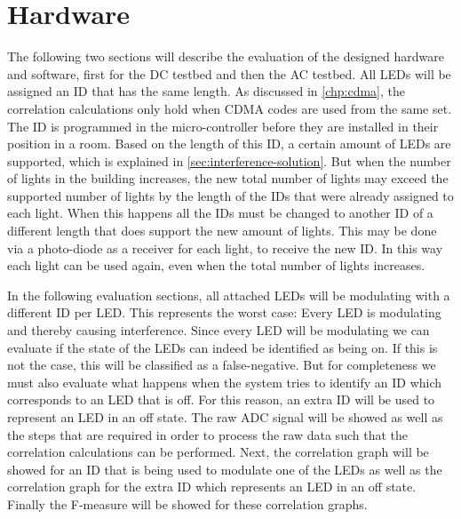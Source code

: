 
\section{Hardware}
\label{sec:hardware-evaluation}

The following two sections will describe the evaluation of the designed hardware and software, first for the DC testbed and then the AC testbed.
All LEDs will be assigned an ID that has the same length.
As discussed in \autoref{chp:cdma}, the correlation calculations only hold when CDMA codes are used from the same set.
The ID is programmed in the micro-controller before they are installed in their position in a room.
Based on the length of this ID, a certain amount of LEDs are supported, which is explained in \autoref{sec:interference-solution}.
But when the number of lights in the building increases, the new total number of lights may exceed the supported number of lights by the length of the IDs that were already assigned to each light.
When this happens all the IDs must be changed to another ID of a different length that does support the new amount of lights.
This may be done via a photo-diode as a receiver for each light, to receive the new ID.
In this way each light can be used again, even when the total number of lights increases.


In the following evaluation sections, all attached LEDs will be modulating with a different ID per LED.
This represents the worst case: Every LED is modulating and thereby causing interference.
Since every LED will be modulating we can evaluate if the state of the LEDs can indeed be identified as being on.
If this is not the case, this will be classified as a false-negative.
But for completeness we must also evaluate what happens when the system tries to identify an ID which corresponds to an LED that is off.
For this reason, an extra ID will be used to represent an LED in an off state.
The raw ADC signal will be showed as well as the steps that are required in order to process the raw data such that the correlation calculations can be performed.
Next, the correlation graph will be showed for an ID that is being used to modulate one of the LEDs as well as the correlation graph for the extra ID which represents an LED in an off state. 
Finally the F-measure will be showed for these correlation graphs.











